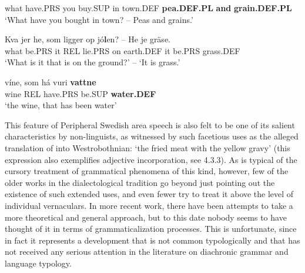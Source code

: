 what  have.PRS  you  buy.SUP  in  town.DEF    \textbf{pea.DEF.PL} \textbf{and} \textbf{grain.DEF.PL}\\

\glt ‘What have you bought in town? – Peas and grains.’

\z

\item 


 \ea\label{}
\gll Kva  jer  he,  som  ligger  op  jó\textbf{l}en?  –  He  je  gräse.\\


what  be.PRS  it  REL  lie.PRS  on  earth.DEF    it  be.PRS  grass.DEF\\

\glt ‘What is it that is on the ground?’ – ‘It is grass.’

\z

\item 


 \ea\label{}
\gll víne,  som  há  vuri  \textbf{vattne}\\


wine  REL  have.PRS  be.SUP  \textbf{water.DEF}\\

\glt ‘the wine, that has been water’

\z

This feature of Peripheral Swedish area speech is also felt to be one of its salient characteristics by non-linguists, as witnessed by such facetious uses as the alleged translation of into Westrobothnian:  ‘the fried meat with the yellow gravy’ (this expression also exemplifies adjective incorporation, see 4.3.3). As is typical of the cursory treatment of grammatical phenomena of this kind, however, few of the older works in the dialectological tradition go beyond just pointing out the existence of such extended uses, and even fewer try to treat it above the level of individual vernaculars. In more recent work, there have been attempts to take a more theoretical and general approach, but to this date nobody seems to have thought of it in terms of grammaticalization processes. This is unfortunate, since in fact it represents a development that is not common typologically and that has not received any serious attention in the literature on diachronic grammar and language typology.

